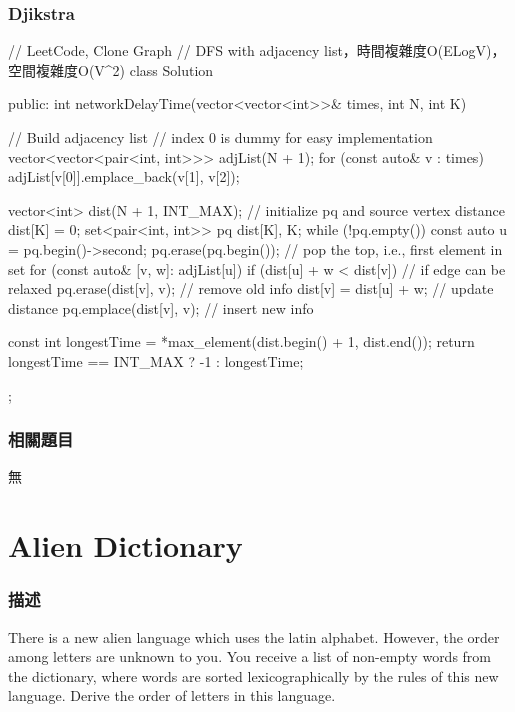 \subsubsection{Djikstra}
\begin{Code}
// LeetCode, Clone Graph
// DFS with adjacency list，時間複雜度O(ELogV)，空間複雜度O(V^2)
class Solution {
public:
    int networkDelayTime(vector<vector<int>>& times, int N, int K)
    {
        // Build adjacency list
        // index 0 is dummy for easy implementation
        vector<vector<pair<int, int>>> adjList(N + 1);
        for (const auto& v : times)
            adjList[v[0]].emplace_back(v[1], v[2]);

        vector<int> dist(N + 1, INT_MAX);
        // initialize pq and source vertex distance
        dist[K] = 0;
        set<pair<int, int>> pq {{dist[K], K}};
        while (!pq.empty()) {
            const auto u = pq.begin()->second;
            pq.erase(pq.begin()); // pop the top, i.e., first element in set
            for (const auto& [v, w]: adjList[u]) {
                if (dist[u] + w < dist[v]) { // if edge can be relaxed
                    pq.erase({dist[v], v}); // remove old info
                    dist[v] = dist[u] + w;  // update distance
                    pq.emplace(dist[v], v); // insert new info
                }
            }
        }

        const int longestTime = *max_element(dist.begin() + 1, dist.end());
        return longestTime == INT_MAX ? -1 : longestTime;
    }
};
\end{Code}

\subsubsection{相關題目}
\begindot
\item 無
\myenddot

\section{Alien Dictionary} %
\label{sec:alien-dictionary}

\subsubsection{描述}
There is a new alien language which uses the latin alphabet. However, the order among letters are unknown to you. You receive a list of non-empty words from the dictionary, where words are sorted lexicographically by the rules of this new language. Derive the order of letters in this language.

